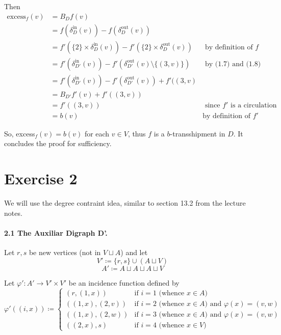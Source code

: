\documentclass[a4paper,10pt, leqno]{article}
\theoremstyle{definition}
\def\blankpage{%
      \null%
      \clearpage}
\begin{document}
Then
\begin{align*}
 \text{excess}_f(v) &= B_Df(v) \\
&= f(\delta_D^{\text{in}}(v)) - f(\delta_D^{\text{out}}(v)) \\
&= f'(\{2\} \times \delta_D^{\text{in}}(v)) - f'(\{2\} \times \delta_D^{\text{out}}(v)) &\text{ by definition of }f\\
&= f'(\delta_{D'}^{\text{in}}(v)) - f'(\delta_{D'}^{\text{out}}(v)  \setminus \{(3, v)\}) &\text{ by (1.7) and (1.8) } \\
&= f'(\delta_{D'}^{\text{in}}(v)) - f'(\delta_{D'}^{\text{out}}(v)) + f'((3, v)  \\
&= B_{D'}f'(v) + f'((3, v)) \\
&= f'((3, v)) &\text{ since $f'$ is a circulation} \\
&= b(v) &\text{by definition of } f'
\end{align*}

So, excess$_f(v) = b(v)$ for each $v \in V$, thus $f$ is a $b$-transshipment in $D$. It concludes the proof for sufficiency.

\blankpage
\section*{Exercise 2}

We will use the degree contraint idea, similar to section 13.2 from the lecture notes.

\paragraph{\textbf{2.1 The Auxiliar Digraph D'.}}

Let $r, s$ be new vertices (not in $V \sqcup A$) and let 
$$V' \coloneqq \{r, s\} \cup (A \sqcup V)$$
$$A' \coloneqq A \sqcup A \sqcup A \sqcup V$$

Let $\varphi' : A' \to V' \times V'$ be an incidence function defined by
$$
\varphi'((i, x)) \coloneqq
\left\{
	\begin{array}{ll}
		(r, (1, x))  & \mbox{if } i = 1 \text{ (whence } x \in A)\\
		((1, x), (2, v)) & \mbox{if } i = 2 \text{ (whence } x \in A) \text{ and } \varphi(x) = (v, w) \\
		((1, x), (2, w))  & \mbox{if } i = 3 \text{ (whence } x \in A) \text{ and } \varphi(x) = (v, w) \\
		((2, x), s)  & \mbox{if } i = 4 \text{ (whence } x \in V)
	\end{array}
\right.
$$
\end{document}
